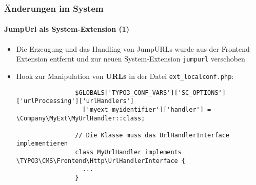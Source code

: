 \begin{frame}[fragile]
	\frametitle{Änderungen im System}
	\framesubtitle{JumpUrl als System-Extension (1)}

	\lstset{basicstyle=\tiny\ttfamily}

	\begin{itemize}

		\item Die Erzeugung und das Handling von JumpURLs wurde aus der Frontend-Extension
			entfernt und zur neuen System-Extension \texttt{jumpurl} verschoben

		\item Hook zur Manipulation von \textbf{URLs} in der Datei \texttt{ext\_localconf.php}:

			\begin{lstlisting}
				$GLOBALS['TYPO3_CONF_VARS']['SC_OPTIONS']['urlProcessing']['urlHandlers']
				  ['myext_myidentifier']['handler'] = \Company\MyExt\MyUrlHandler::class;

				// Die Klasse muss das UrlHandlerInterface implementieren
				class MyUrlHandler implements \TYPO3\CMS\Frontend\Http\UrlHandlerInterface {
				  ...
				}
			\end{lstlisting}

	\end{itemize}

	\breakingchange

\end{frame}

